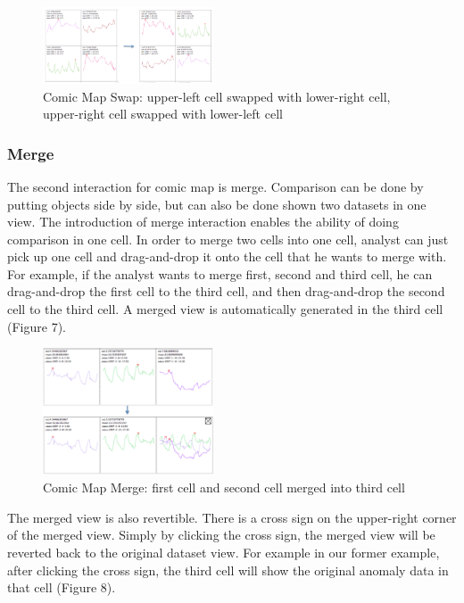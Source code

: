 \documentclass{vgtc}                          %
\begin{document}
 \begin{figure}[htb]
	\centering
  \includegraphics[width=0.45\textwidth]{swap.jpg}
  \caption{Comic Map Swap: upper-left cell swapped with lower-right cell, upper-right cell swapped with lower-left cell}
\end{figure}

\subsubsection{Merge}
The second interaction for comic map is merge. Comparison can be done by putting objects side by side, but can also be done shown two datasets in one view. The introduction of merge interaction enables the ability of doing comparison in one cell. 
In order to merge two cells into one cell, analyst can just pick up one cell and drag-and-drop it onto the cell that he wants to merge with. For example, if the analyst wants to merge first, second and third cell, he can drag-and-drop the first cell to the third cell, and then drag-and-drop the second cell to the third cell. A merged view is automatically generated in the third cell (Figure 7).

 \begin{figure}[htb]
	\centering
  \includegraphics[width=0.45\textwidth]{merge.jpg}
  \caption{Comic Map Merge: first cell and second cell merged into third cell}
\end{figure}
 
The merged view is also revertible. There is a cross sign on the upper-right corner of the merged view. Simply by clicking the cross sign, the merged view will be reverted back to the original dataset view. For example in our former example, after clicking the cross sign, the third cell will show the original anomaly data in that cell (Figure 8).
\end{document}
